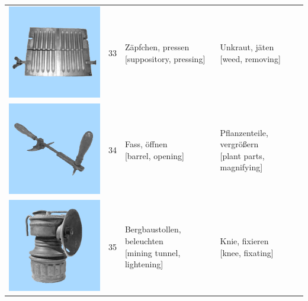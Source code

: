 \documentclass[
  english,
  man,floatsintext]{apa7}
\begin{document}
\begin{center}
\begin{ThreePartTable}
{\begin{longtable}{llll}
\includegraphics[valign=c, scale=0.23]{../materials/unfamiliar/33.png} & 33 & \makecell[l]{Zäpfchen, pressen\\{[suppository, pressing]}} & \makecell[l]{Unkraut, jäten\\{[weed, removing]}}\\
\includegraphics[valign=c, scale=0.23]{../materials/unfamiliar/34.png} & 34 & \makecell[l]{Fass, öffnen\\{[barrel, opening]}} & \makecell[l]{Pflanzenteile, vergrößern\\{[plant parts, magnifying]}}\\
\includegraphics[valign=c, scale=0.23]{../materials/unfamiliar/35.png} & 35 & \makecell[l]{Bergbaustollen, beleuchten\\{[mining tunnel, lightening]}} & \makecell[l]{Knie, fixieren\\{[knee, fixating]}}\\

\end{longtable}}
\end{ThreePartTable}
\end{center}
\end{document}
